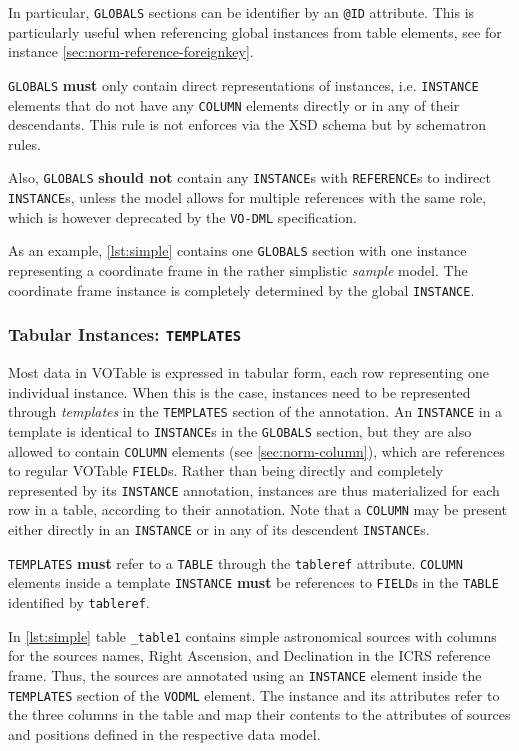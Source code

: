 \documentclass[11pt,a4paper]{ivoa}
\begin{document}
In particular, \texttt{GLOBALS} sections can be identifier by an
\texttt{@ID} attribute. This is particularly useful when referencing
global instances from table elements, see for instance
\ref{sec:norm-reference-foreignkey}.

\texttt{GLOBALS} \textbf{must} only contain direct representations of
instances, i.e. \texttt{INSTANCE} elements that do not have any
\texttt{COLUMN} elements directly or in any of their descendants. This
rule is not enforces via the XSD schema but by schematron rules.

Also, \texttt{GLOBALS} \textbf{should not} contain any
\texttt{INSTANCE}s with \texttt{REFERENCE}s to indirect
\texttt{INSTANCE}s, unless the model allows for multiple references with
the same role, which is however deprecated by the \texttt{VO-DML}
specification.

As an example, \ref{lst:simple} contains one \texttt{GLOBALS} section
with one instance representing a coordinate frame in the rather
simplistic \emph{sample} model. The coordinate frame instance is
completely determined by the global \texttt{INSTANCE}.

\subsubsection{Tabular Instances:
\texttt{TEMPLATES}}\label{sec:norm-templates}

Most data in VOTable is expressed in tabular form, each row representing
one individual instance. When this is the case, instances need to be
represented through \emph{templates} in the \texttt{TEMPLATES} section
of the annotation. An \texttt{INSTANCE} in a template is identical to
\texttt{INSTANCE}s in the \texttt{GLOBALS} section, but they are also
allowed to contain \texttt{COLUMN} elements (see
\ref{sec:norm-column}), which are references to regular VOTable
\texttt{FIELD}s. Rather than being directly and completely represented
by its \texttt{INSTANCE} annotation, instances are thus materialized for
each row in a table, according to their annotation. Note that a
\texttt{COLUMN} may be present either directly in an \texttt{INSTANCE}
or in any of its descendent \texttt{INSTANCE}s.

\texttt{TEMPLATES} \textbf{must} refer to a \texttt{TABLE} through the
\texttt{tableref} attribute. \texttt{COLUMN} elements inside a template
\texttt{INSTANCE} \textbf{must} be references to \texttt{FIELD}s in the
\texttt{TABLE} identified by \texttt{tableref}.

In \ref{lst:simple} table \texttt{\_table1} contains simple
astronomical sources with columns for the sources names, Right
Ascension, and Declination in the ICRS reference frame. Thus, the
sources are annotated using an \texttt{INSTANCE} element inside the
\texttt{TEMPLATES} section of the \texttt{VODML} element. The instance
and its attributes refer to the three columns in the table and map their
contents to the attributes of sources and positions defined in the
respective data model.
\end{document}
